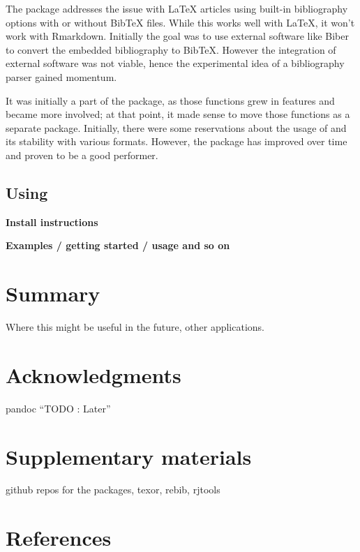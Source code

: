 The  package addresses the issue with LaTeX articles using built-in bibliography options with or without BibTeX files. While this works well with LaTeX, it won't work with Rmarkdown. Initially the goal was to use external software like Biber to convert the embedded bibliography to BibTeX.
However the integration of external software was not viable, hence the experimental idea of a bibliography parser gained momentum.

It was initially a part of the  package, as those functions grew in features and became more involved; at that point, it made sense to move those functions as a separate package. Initially, there were some reservations about
the usage of  and its stability with various formats. However, the package has improved over time and proven to be a good performer.

\hypertarget{using-1}{%
\subsection{\texorpdfstring{Using }{Using }}\label{using-1}}

\textbf{Install instructions}

\textbf{Examples / getting started / usage and so on}

\hypertarget{summary}{%
\section{Summary}\label{summary}}

Where this might be useful in the future, other applications.

\hypertarget{acknowledgments}{%
\section{Acknowledgments}\label{acknowledgments}}

pandoc
``TODO : Later''

\hypertarget{supplementary-materials}{%
\section{Supplementary materials}\label{supplementary-materials}}

github repos for the packages, texor, rebib, rjtools

\hypertarget{references}{%
\section*{References}\label{references}}

